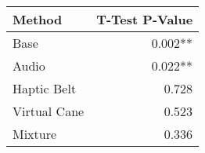 
\centering
\begin{tabular}{lr}
\toprule
      Method & T-Test P-Value \\
\midrule
        Base &        0.002** \\
       Audio &        0.022** \\
 Haptic Belt &          0.728 \\
Virtual Cane &          0.523 \\
     Mixture &          0.336 \\
\bottomrule
\end{tabular}
